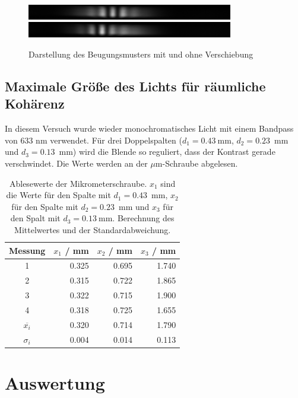\documentclass{article}
\begin{document}
\begin{figure}[H]
\centering
\caption{Darstellung des Beugungsmusters mit und ohne Verschiebung}
\includegraphics[width=9cm]{moodle/img_noShift.png}
\includegraphics[width=9cm]{moodle/img_Shift.png}
\end{figure}


\subsection{Maximale Größe des Lichts für räumliche Kohärenz}

In diesem Versuch wurde wieder monochromatisches Licht mit einem Bandpass von 633 nm verwendet. Für drei Doppelspalten ($d_1=0.43~$mm, $d_2=0.23$~mm und $d_3=0.13$~mm) wird die Blende so reguliert, dass der Kontrast gerade verschwindet. Die Werte werden an der $\mu$m-Schraube abgelesen.

\begin{table}[H]
\caption{Ablesewerte der Mikrometerschraube. $x_1$ sind die Werte für den Spalte mit $d_1=0.43$~mm, $x_2$ für den Spalte mit $d_2=0.23$~mm und $x_3$ für den Spalt mit $d_3=0.13~$mm. Berechnung des Mittelwertes und der Standardabweichung.}
\begin{tabular}{c|rrr}
Messung & $x_1$ / mm & $x_2$ / mm & $x_3$ / mm \\
\hline
1 & 0.325 & 0.695 & 1.740 \\
2 & 0.315 & 0.722 & 1.865 \\
3 & 0.322 & 0.715 & 1.900 \\
4 & 0.318 & 0.725 & 1.655 \\
\hline 
$\overline{x_i}$ & 0.320 & 0.714 & 1.790 \\
$\sigma_i$ & 0.004 & 0.014 & 0.113
\end{tabular}

\end{table}


\newpage



\section{Auswertung}
\end{document}
